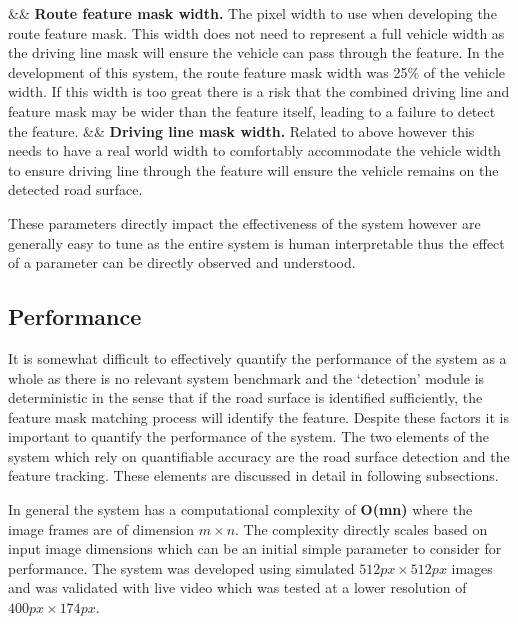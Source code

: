 \documentclass[]{aiaa-tc}%
\begin{document}
\begin{easylist}
	&& \textbf{Route feature mask width.} The pixel width to use when developing the route feature mask. This width does not need to represent a full vehicle width as the driving line mask will ensure the vehicle can pass through the feature. In the development of this system, the route feature mask width was 25\% of the vehicle width. If this width is too great there is a risk that the combined driving line and feature mask may be wider than the feature itself, leading to a failure to detect the feature.
	&& \textbf{Driving line mask width.} Related to above however this needs to have a real world width to comfortably accommodate the vehicle width to ensure driving line through the feature will ensure the vehicle remains on the detected road surface.
\end{easylist}

These parameters directly impact the effectiveness of the system however are generally easy to tune as the entire system is human interpretable thus the effect of a parameter can be directly observed and understood.


\subsection{Performance} \label{s:performance}

It is somewhat difficult to effectively quantify the performance of the system as a whole as there is no relevant system benchmark and the `detection' module is deterministic in the sense that if the road surface is identified sufficiently, the feature mask matching process will identify the feature. Despite these factors it is important to quantify the performance of the system. The two elements of the system which rely on quantifiable accuracy are the road surface detection and the feature tracking. These elements are discussed in detail in following subsections.

In general the system has a computational complexity of \textbf{O(mn)} where the image frames are of dimension $m\times n$. The complexity directly scales based on input image dimensions which can be an initial simple parameter to consider for performance. The system was developed using simulated $512px \times 512px$ images and was validated with live video which was tested at a lower resolution of $400px \times 174px$.
\end{document}
